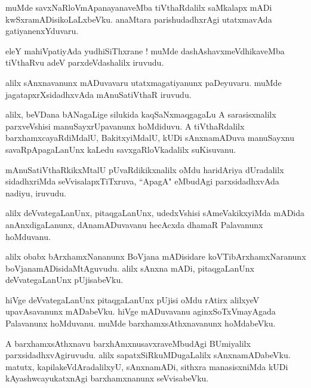 \documentclass{article}
\begin{document}
\begin{mn}
muMde savxNaRloVmApanayanaveMba tiVthaRdalilx saMkalapx mADi kwSxramADisikoLaLxbeVku. anaMtara 
parishudadhxrAgi utatxmavAda gatiyanenxYduvaru.
\end{mn}

\begin{mn}
eleY mahiVpatiyAda yudhiSiThxrane ! muMde dashAshavxmeVdhikaveMba tiVthaRvu adeV parxdeVdashalilx 
iruvudu.
\end{mn}

\begin{mn}
alilx sAnxnavanunx mADuvavaru utatxmagatiyanunx  paDeyuvaru. muMde jagatapxrXsidadhxvAda 
mAnuSatiVthaR iruvudu.
\end{mn}

\begin{mn}
alilx, beVDana bANagaLige silukida kaqSaNxmaqgagaLu A sarasisxnalilx parxveVshisi 
manuSayxrUpavanunx hoMdiduvu. A tiVthaRdalilx barxhamxcayaRdiMdalU, BakitxyiMdalU, 
kUDi sAnxnamADuva manuSayxnu savaRpApagaLanUnx kaLedu savxgaRloVkadalilx suKisuvanu.
\end{mn}

\begin{mn}
mAnuSatiVthaRkikxMtalU pUvaRdikikxnalilx oMdu haridAriya dUradalilx sidadhxriMda 
seVvisalapxTiTxruva, ``ApagA" eMbudAgi parxsidadhxvAda nadiyu, iruvudu.
\end{mn}

\begin{mn}
alilx deVvategaLanUnx, pitaqgaLanUnx, udedxVshisi sAmeVakikxyiMda mADida anAnxdigaLanunx, 
dAnamADuvavanu hecAcxda dhamaR Palavanunx hoMduvanu. 
\end{mn}

\begin{mn}
alilx obabx bArxhamxNananunx BoVjana mADisidare koVTibArxhamxNaranunx boVjanamADisidaMtAguvudu.
alilx sAnxna mADi, pitaqgaLanUnx  deVvategaLanUnx pUjisabeVku.
\end{mn}

\begin{mn}
hiVge deVvategaLanUnx pitaqgaLanUnx pUjisi oMdu rAtirx alilxyeV  upavAsavanunx mADabeVku.
hiVge mADuvavanu aginxSoTxVmayAgada Palavanunx hoMduvanu. muMde barxhamxsAthxnavanunx hoMdabeVku.
\end{mn}

\begin{mn}
A barxhamxsAthxnavu barxhAmxnusavxraveMbudAgi BUmiyalilx  parxsidadhxvAgiruvudu. alilx 
sapatxSiRkuMDugaLalilx sAnxnamADabeVku. matutx, kapilakeVdAradalilxyU, sAnxnamADi, sithxra
manasisxniMda kUDi kAyashwcayukatxnAgi barxhamxnanunx seVvisabeVku.
\end{mn}
\end{document}
